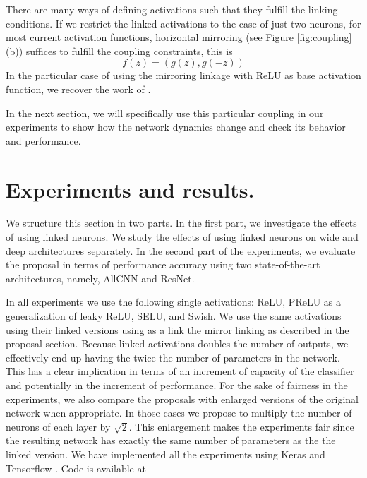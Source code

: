 \documentclass[10pt,twocolumn,letterpaper]{article}
\begin{document}
There are many ways of defining activations such that they fulfill the linking conditions. If we restrict the linked activations to the case of just two neurons, for most current activation functions, horizontal mirroring (see Figure \ref{fig:coupling}(b)) suffices to fulfill the coupling constraints, this is
\begin{equation}
f(z) = (g(z),g(-z))
\label{eq:doublerelu}
\end{equation}
In the particular case of using the mirroring linkage with ReLU as base activation function, we recover the work of \cite{crelu}.

In the next section, we will specifically use this particular coupling in our experiments to show how the network dynamics change and check its behavior and performance.

\section{Experiments and results.}\label{sec:experiments}

We structure this section in two parts. In the first part, we investigate the effects of using linked neurons. We  study the effects of using linked neurons on wide and deep architectures separately. In the second part of the experiments, we evaluate the proposal in terms of performance accuracy using two state-of-the-art architectures, namely, AllCNN\cite{allcnn} and ResNet\cite{resnet}.

In all experiments we use the following single activations: ReLU, PReLU as a generalization of leaky ReLU, SELU, and Swish. We use the same activations using their linked versions using as a link the mirror linking as described in the proposal section. Because linked activations doubles the number of outputs, we effectively end up having the twice the number of parameters in the network. This has a clear implication in terms of an increment of capacity of the classifier and potentially in the increment of performance. For the sake of fairness in the experiments, we also compare the proposals with enlarged versions of the original network when appropriate. In those cases we propose to multiply the number of neurons of each layer by $\sqrt{2}$. This enlargement makes the experiments fair since the resulting network has exactly the same number of parameters as the the linked version. We have implemented all the experiments using Keras \cite{chollet2015keras} and Tensorflow \cite{tensorflow2015-whitepaper}. Code is available at \cite{code}
\end{document}

